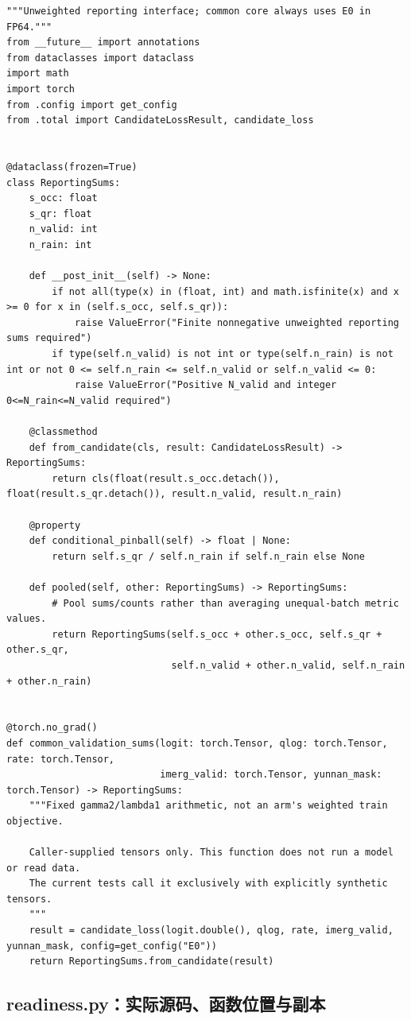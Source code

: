 \documentclass[UTF8,fontset=fandol,10pt]{ctexart}
\begin{document}
\begin{lstlisting}
"""Unweighted reporting interface; common core always uses E0 in FP64."""
from __future__ import annotations
from dataclasses import dataclass
import math
import torch
from .config import get_config
from .total import CandidateLossResult, candidate_loss


@dataclass(frozen=True)
class ReportingSums:
    s_occ: float
    s_qr: float
    n_valid: int
    n_rain: int

    def __post_init__(self) -> None:
        if not all(type(x) in (float, int) and math.isfinite(x) and x >= 0 for x in (self.s_occ, self.s_qr)):
            raise ValueError("Finite nonnegative unweighted reporting sums required")
        if type(self.n_valid) is not int or type(self.n_rain) is not int or not 0 <= self.n_rain <= self.n_valid or self.n_valid <= 0:
            raise ValueError("Positive N_valid and integer 0<=N_rain<=N_valid required")

    @classmethod
    def from_candidate(cls, result: CandidateLossResult) -> ReportingSums:
        return cls(float(result.s_occ.detach()), float(result.s_qr.detach()), result.n_valid, result.n_rain)

    @property
    def conditional_pinball(self) -> float | None:
        return self.s_qr / self.n_rain if self.n_rain else None

    def pooled(self, other: ReportingSums) -> ReportingSums:
        # Pool sums/counts rather than averaging unequal-batch metric values.
        return ReportingSums(self.s_occ + other.s_occ, self.s_qr + other.s_qr,
                             self.n_valid + other.n_valid, self.n_rain + other.n_rain)


@torch.no_grad()
def common_validation_sums(logit: torch.Tensor, qlog: torch.Tensor, rate: torch.Tensor,
                           imerg_valid: torch.Tensor, yunnan_mask: torch.Tensor) -> ReportingSums:
    """Fixed gamma2/lambda1 arithmetic, not an arm's weighted train objective.

    Caller-supplied tensors only. This function does not run a model or read data.
    The current tests call it exclusively with explicitly synthetic tensors.
    """
    result = candidate_loss(logit.double(), qlog, rate, imerg_valid, yunnan_mask, config=get_config("E0"))
    return ReportingSums.from_candidate(result)
\end{lstlisting}


\subsection{readiness.py：实际源码、函数位置与副本}
\end{document}
